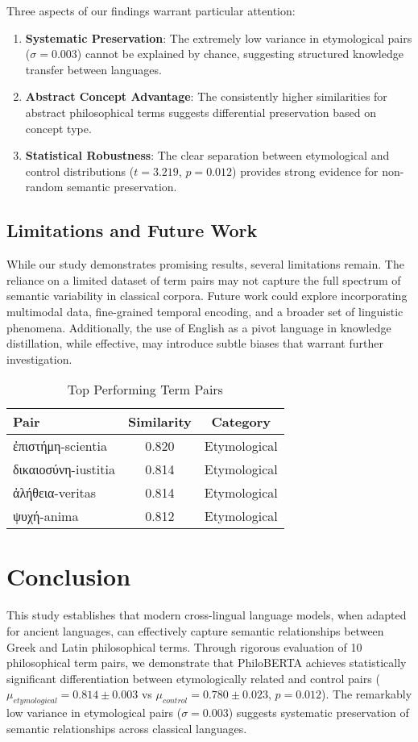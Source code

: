 \documentclass[11pt]{article} %
\begin{document}
Three aspects of our findings warrant particular attention:

\begin{enumerate}
\item \textbf{Systematic Preservation}: The extremely low variance in etymological pairs ($\sigma = 0.003$) cannot be explained by chance, suggesting structured knowledge transfer between languages.

\item \textbf{Abstract Concept Advantage}: The consistently higher similarities for abstract philosophical terms suggests differential preservation based on concept type.

\item \textbf{Statistical Robustness}: The clear separation between etymological and control distributions ($t = 3.219$, $p = 0.012$) provides strong evidence for non-random semantic preservation.
\end{enumerate}

\subsection*{Limitations and Future Work}
While our study demonstrates promising results, several limitations remain. The reliance on a limited dataset of term pairs may not capture the full spectrum of semantic variability in classical corpora. Future work could explore incorporating multimodal data, fine-grained temporal encoding, and a broader set of linguistic phenomena. Additionally, the use of English as a pivot language in knowledge distillation, while effective, may introduce subtle biases that warrant further investigation.

\begin{table}[htbp]
\centering
\caption{Top Performing Term Pairs}
\begin{tabular}{lcc}
Pair & Similarity & Category \\
\hline
ἐπιστήμη-scientia & 0.820 & Etymological \\
δικαιοσύνη-iustitia & 0.814 & Etymological \\
ἀλήθεια-veritas & 0.814 & Etymological \\
ψυχή-anima & 0.812 & Etymological \\
\end{tabular}
\end{table}

\section{Conclusion}
This study establishes that modern cross-lingual language models, when adapted for ancient languages, can effectively capture semantic relationships between Greek and Latin philosophical terms. Through rigorous evaluation of 10 philosophical term pairs, we demonstrate that PhiloBERTA achieves statistically significant differentiation between etymologically related and control pairs ($\mu_{etymological} = 0.814 \pm 0.003$ vs $\mu_{control} = 0.780 \pm 0.023$, $p = 0.012$). The remarkably low variance in etymological pairs ($\sigma = 0.003$) suggests systematic preservation of semantic relationships across classical languages.
\end{document}
